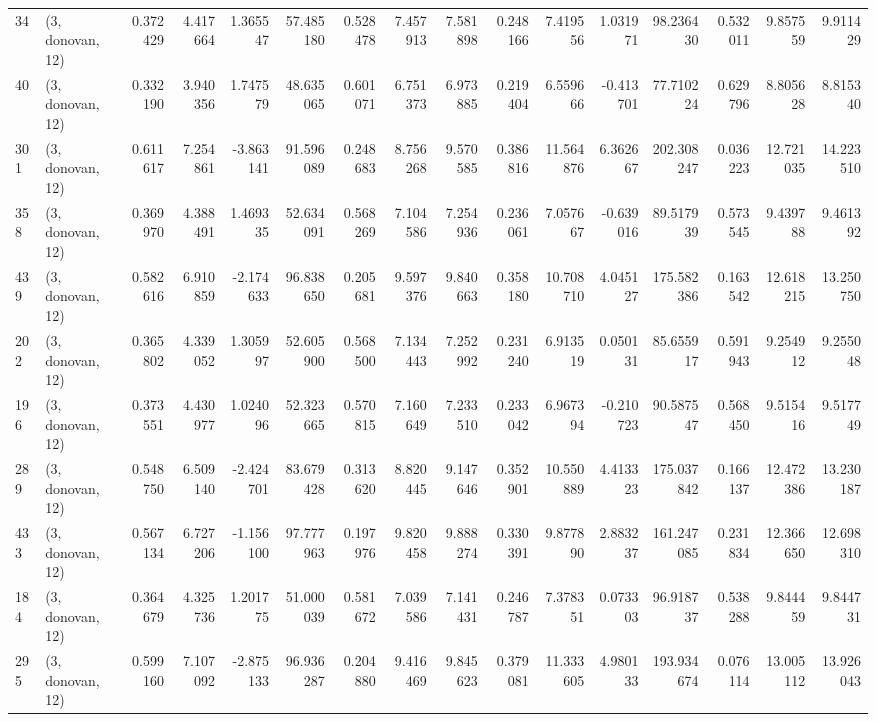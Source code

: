 \begin{tabular}{llrrrrrrrrrrrrrr}
34  &  (3, donovan, 12) &   0.372429 &   4.417664 &   1.365547 &    57.485180 &   0.528478 &   7.457913 &   7.581898 &  0.248166 &   7.419556 &   1.031971 &    98.236430 &  0.532011 &   9.857559 &   9.911429 \\
40  &  (3, donovan, 12) &   0.332190 &   3.940356 &   1.747579 &    48.635065 &   0.601071 &   6.751373 &   6.973885 &  0.219404 &   6.559666 &  -0.413701 &    77.710224 &  0.629796 &   8.805628 &   8.815340 \\
301 &  (3, donovan, 12) &   0.611617 &   7.254861 &  -3.863141 &    91.596089 &   0.248683 &   8.756268 &   9.570585 &  0.386816 &  11.564876 &   6.362667 &   202.308247 &  0.036223 &  12.721035 &  14.223510 \\
358 &  (3, donovan, 12) &   0.369970 &   4.388491 &   1.469335 &    52.634091 &   0.568269 &   7.104586 &   7.254936 &  0.236061 &   7.057667 &  -0.639016 &    89.517939 &  0.573545 &   9.439788 &   9.461392 \\
439 &  (3, donovan, 12) &   0.582616 &   6.910859 &  -2.174633 &    96.838650 &   0.205681 &   9.597376 &   9.840663 &  0.358180 &  10.708710 &   4.045127 &   175.582386 &  0.163542 &  12.618215 &  13.250750 \\
202 &  (3, donovan, 12) &   0.365802 &   4.339052 &   1.305997 &    52.605900 &   0.568500 &   7.134443 &   7.252992 &  0.231240 &   6.913519 &   0.050131 &    85.655917 &  0.591943 &   9.254912 &   9.255048 \\
196 &  (3, donovan, 12) &   0.373551 &   4.430977 &   1.024096 &    52.323665 &   0.570815 &   7.160649 &   7.233510 &  0.233042 &   6.967394 &  -0.210723 &    90.587547 &  0.568450 &   9.515416 &   9.517749 \\
289 &  (3, donovan, 12) &   0.548750 &   6.509140 &  -2.424701 &    83.679428 &   0.313620 &   8.820445 &   9.147646 &  0.352901 &  10.550889 &   4.413323 &   175.037842 &  0.166137 &  12.472386 &  13.230187 \\
433 &  (3, donovan, 12) &   0.567134 &   6.727206 &  -1.156100 &    97.777963 &   0.197976 &   9.820458 &   9.888274 &  0.330391 &   9.877890 &   2.883237 &   161.247085 &  0.231834 &  12.366650 &  12.698310 \\
184 &  (3, donovan, 12) &   0.364679 &   4.325736 &   1.201775 &    51.000039 &   0.581672 &   7.039586 &   7.141431 &  0.246787 &   7.378351 &   0.073303 &    96.918737 &  0.538288 &   9.844459 &   9.844731 \\
295 &  (3, donovan, 12) &   0.599160 &   7.107092 &  -2.875133 &    96.936287 &   0.204880 &   9.416469 &   9.845623 &  0.379081 &  11.333605 &   4.980133 &   193.934674 &  0.076114 &  13.005112 &  13.926043 \\

\end{tabular}

